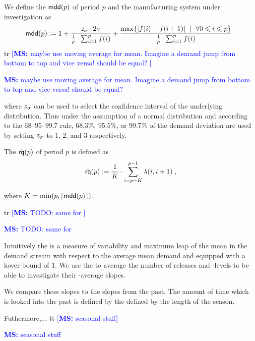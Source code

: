 \documentclass[mnsc]{informs3}
\DeclarePairedDelimiter{\ceil}{\lceil}{\rceil}
\newcommand\MS[2][r]{\ifx t#1 \textcolor{blue}{[\textbf{MS:} #2]}
  \else \begin{center}\textcolor{blue}{\textbf{MS:} #2} \end{center} \fi}
\begin{document}
\begin{definition}
  We define the \emph{\mddname{}} $\mathsf{mdd}(p)$ of period $p$ and the manufacturing system
  under investigation as
  \begin{align*}
    \mathsf{mdd}(p) \mathrel{:=} 1 +
    \frac{ z_{\sigma} \cdot 2 \sigma}{\frac{1}{p} \cdot \sum_{i=1}^{p}{f(i)}}  +
    \frac{\max \{|f(i)-f(i+1)|\ \mid \ \forall 0 \leqslant i \leqslant p \}}{\frac{1}{p} \cdot \sum_{i=1}^{p}{f(i)}}
  \end{align*}
  \MS{maybe use moving average for mean. Imagine a demand jump from bottom to top and vice versa! should
    be equal? }
  where $z_{\sigma}$ can be used to select the confidence interval of the underlying distribution. Thus
  under the assumption of a normal distribution and according to the $68$--$95$--$99.7$ rule,
  $68.3\%$, $95.5\%$, or $99.7\%$ of the demand deviation are used by setting $z_{\sigma}$ to $1$, $2$, and
  $3$ respectively.
\end{definition}

\begin{definition}
  The \emph{\avgrqname} $\bar{\mathsf{rq}}(p)$ of period $p$ is defined as
  \begin{align*}
    \avgrq{p} \defsym \frac{1}{K} \cdot \sum_{i=p-K}^{p-1}{ \ri{i}{i+1} }\tcom
  \end{align*}

  where $K=\min(p,\ceil{\mdd{p}})$.
\end{definition}

\MS{TODO: same for \WIP{}}


Intuitively the \mddname{} is a measure of variability and maximum leap of the mean in the demand
stream with respect to the average mean demand and equipped with a lower-bound of $1$. We use the
\mddname{} to average the number of releases and \WIP{}-levels to be able to investigate their
\textsl{\mddname{}}-average slopes.


We compare these slopes to the slopes from the past. The amount of time which is looked into the
past is defined by the defined by the length of the season.


Futhermore,... \MS[t]{seasonal stuff}
%
\end{document}
